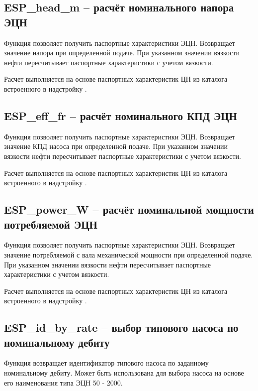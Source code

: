 \subsection{ESP\_head\_m – расчёт номинального напора ЭЦН}
Функция позволяет получить паспортные характеристики ЭЦН. Возвращает значение напора при определенной подаче. При указанном значении вязкости нефти пересчитывает паспортные характеристики с учетом вязкости.


Расчет выполняется на основе паспортных характеристик ЦН из каталога встроенного в надстройку \unf{}. 

\subsection{ESP\_eff\_fr – расчёт номинального КПД ЭЦН}
Функция позволяет получить паспортные характеристики ЭЦН. Возвращает значение КПД насоса при определенной подаче. При указанном значении вязкости нефти пересчитывает паспортные характеристики с учетом вязкости.


Расчет выполняется на основе паспортных характеристик ЦН из каталога встроенного в надстройку \unf{}. 

\subsection{ESP\_power\_W – расчёт номинальной мощности потребляемой ЭЦН}
Функция позволяет получить паспортные характеристики ЭЦН. Возвращает значение потребляемой с вала механической мощности при определенной подаче. При указанном значении вязкости нефти пересчитывает паспортные характеристики с учетом вязкости. 


Расчет выполняется на основе паспортных характеристик ЦН из каталога встроенного в надстройку \unf{}. 

\subsection{ESP\_id\_by\_rate – выбор типового насоса по номинальному дебиту}
Функция возвращает идентификатор типового насоса по заданному номинальному дебиту. 
Может быть использована для выбора насоса на основе его наименования типа ЭЦН 50 - 2000.

